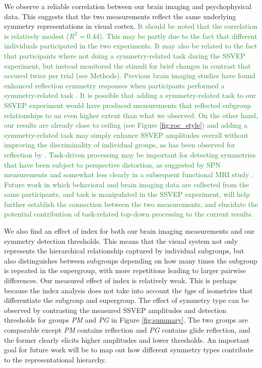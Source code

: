 \documentclass[11pt, twoside]{article}
\begin{document}
We observe a reliable correlation between our brain imaging and psychophysical data. This suggests that the two measurements reflect the same underlying symmetry representations in visual cortex. \textcolor{ForestGreen}{It should be noted that the correlation is relatively modest ($R^2 = 0.44$). This may be partly due to the fact that different individuals participated in the two experiments. It may also be related to the fact that participants where not doing a symmetry-related task during the SSVEP experiment, but instead monitored the stimuli for brief changes in contrast that occured twice per trial (see Methods). Previous brain imaging studies have found enhanced reflection symmetry responses when participants performed a symmetry-related task \citep{makin_formation_2020, Sasaki_2005, keefe_2018}. It is possible that adding a symmetry-related task to our SSVEP experiment would have produced measurements that reflected subgroup relationships to an even higher extent than what we observed. On the other hand, our results are already close to ceiling (see Figure \ref{fig:roc_style}) and adding a symmetry-related task may simply enhance SSVEP amplitudes overall without improving the discriminality of individual groups, as has been observed for reflection by \cite{keefe_2018}. Task-driven processing may be important for detecting symmetries that have been subject to perspective distortion, as suggested by SPN measurements \citep{makin_conditions_2015} and somewhat less clearly in a subsequent functional MRI study \citep{keefe_2018}. Future work in which behavioral and brain imaging data are collected from the same participants, and task is manipulated in the SSVEP experiment, will help further establish the connection between the two measurements, and elucidate the potential contribution of task-related top-down processing to the current results.}

We also find an effect of index for both our brain imaging measurements and our symmetry detection thresholds. This means that the visual system not only represents the hierarchical relationship captured by individual subgroups, but also distinguishes between subgroups depending on how many times the subgroup is repeated in the supergroup, with more repetitions leading to larger pairwise differences. Our measured effect of index is relatively weak. This is perhaps because the index analysis does not take into account the \textit{type} of isometries that differentiate the subgroup and supergroup. The effect of symmetry type can be observed by contrasting the measured SSVEP amplitudes and detection thresholds for groups \textit{PM} and \textit{PG} in Figure \ref{fig:summary}. The two groups are comparable except \textit{PM} contains reflection and \textit{PG} contains glide reflection, and the former clearly elicits higher amplitudes and lower thresholds. An important goal for future work will be to map out how different symmetry types contribute to the representational hierarchy. 
\end{document}
